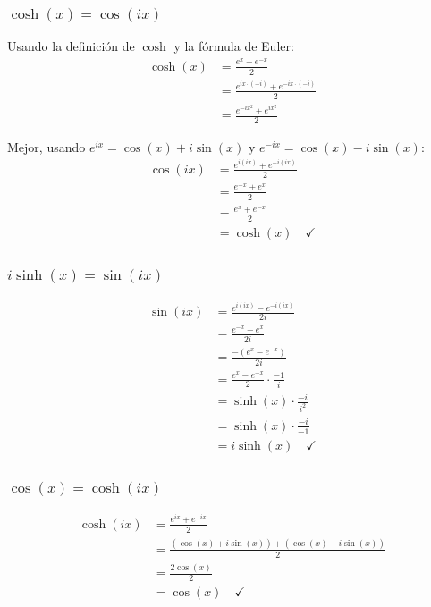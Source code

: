 \documentclass{article}
\begin{document}
\subsubsection*{$\cosh(x) = \cos(ix)$}

Usando la definición de $\cosh$ y la fórmula de Euler:
\begin{align*}
\cosh(x) &= \frac{e^x + e^{-x}}{2} \\
         &= \frac{e^{ix \cdot (-i)} + e^{-ix \cdot (-i)}}{2} \\
         &= \frac{e^{-ix^2} + e^{ix^2}}{2}
\end{align*}

Mejor, usando $e^{ix} = \cos(x) + i\sin(x)$ y $e^{-ix} = \cos(x) - i\sin(x)$:
\begin{align*}
\cos(ix) &= \frac{e^{i(ix)} + e^{-i(ix)}}{2} \\
        &= \frac{e^{-x} + e^{x}}{2} \\
        &= \frac{e^x + e^{-x}}{2} \\
        &= \cosh(x) \quad \checkmark
\end{align*}

\subsubsection*{$i\sinh(x) = \sin(ix)$}

\begin{align*}
\sin(ix) &= \frac{e^{i(ix)} - e^{-i(ix)}}{2i} \\
         &= \frac{e^{-x} - e^{x}}{2i} \\
         &= \frac{-(e^{x} - e^{-x})}{2i} \\
         &= \frac{e^{x} - e^{-x}}{2} \cdot \frac{-1}{i} \\
         &= \sinh(x) \cdot \frac{-i}{i^2} \\
         &= \sinh(x) \cdot \frac{-i}{-1} \\
         &= i\sinh(x) \quad \checkmark
\end{align*}

\subsubsection*{$\cos(x) = \cosh(ix)$}

\begin{align*}
\cosh(ix) &= \frac{e^{ix} + e^{-ix}}{2} \\
         &= \frac{(\cos(x) + i\sin(x)) + (\cos(x) - i\sin(x))}{2} \\
         &= \frac{2\cos(x)}{2} \\
         &= \cos(x) \quad \checkmark
\end{align*}
\end{document}
